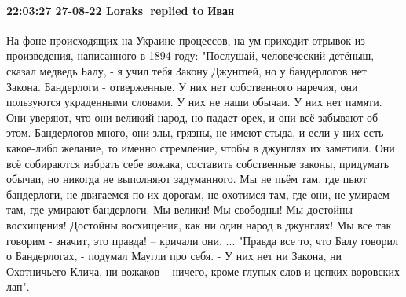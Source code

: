 
 
 
 
 

\paragraph{22:03:27 27-08-22 Loraks 🎀replied to Иван}

На фоне происходящих на Украине процессов, на ум приходит отрывок из произведения, написанного в 1894 году:
"Послушай, человеческий детёныш, - сказал медведь Балу, - я учил тебя Закону Джунглей, но у бандерлогов нет Закона. Бандерлоги - отверженные. У них нет собственного наречия, они пользуются украденными словами. У них не наши обычаи. У них нет памяти. Они уверяют, что они великий народ, но падает орех, и они всё забывают об этом. Бандерлогов много, они злы, грязны, не имеют стыда, и если у них есть какое-либо желание, то именно стремление, чтобы в джунглях их заметили. Они всё собираются избрать себе вожака, составить собственные законы, придумать обычаи, но никогда не выполняют задуманного. Мы не пьём там, где пьют бандерлоги, не двигаемся по их дорогам, не охотимся там, где они, не умираем там, где умирают бандерлоги.
Мы велики! Мы свободны! Мы достойны восхищения! Достойны восхищения, как ни один народ в джунглях! Мы все так говорим - значит, это правда! -- кричали они.
...
"Правда все то, что Балу говорил о Бандерлогах, - подумал Маугли про себя. - У них нет ни Закона, ни Охотничьего Клича, ни вожаков -- ничего, кроме глупых слов и цепких воровских лап".
